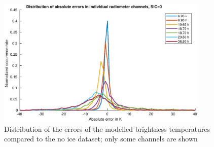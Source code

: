 \documentclass[11pt, a4paper]{article}
\begin{document}

\begin{figure}[h!]
   \centering
   \includegraphics[width=0.9\textwidth]{ValidationForward_SIC0_errordist.eps}
   \caption{Distribution of the errors of the modelled brightness temperatures compared to the no ice dataset; only some channels are shown}
   \label{fig:for0dist}
\end{figure}
\end{document}

